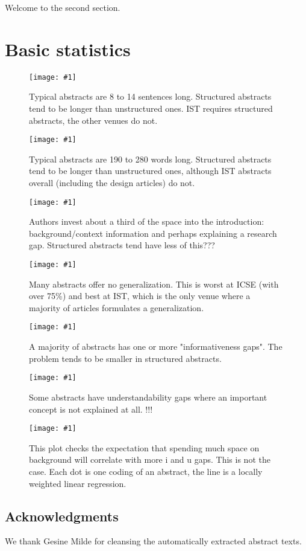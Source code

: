 \documentclass[10pt,journal,compsoc]{IEEEtran}
\newcommand{\Plot}[2]{%
	\begin{figure}[!t]%
		\centering\texttt{[image: \#1]}%
		\vspace{-6mm}\caption{#2}\label{#1}%
	\end{figure}}
\begin{document}
\noindent Welcome to the second section.



\appendix
\section{Basic statistics}

\Plot{boxplots_sentences}{%
  Typical abstracts are 8 to 14 sentences long.
  Structured abstracts tend to be longer than unstructured ones.
  IST requires structured abstracts, the other venues do not.}
\Plot{boxplots_words}{%
  Typical abstracts are 190 to 280 words long. 
  Structured abstracts tend to be longer than unstructured ones, 
  although IST abstracts overall (including the design articles) do not.}
\Plot{boxplots_fraction_introduction}{%
  Authors invest about a third of the space into the introduction:
  background/context information and perhaps explaining a research gap.
  Structured abstracts tend have less of this???}
\Plot{boxplots_fraction_conclusion}{%
  Many abstracts offer no generalization.
  This is worst at ICSE (with over 75\%)
  and best at IST, which is the only venue where a majority of articles formulates a generalization.}
\Plot{boxplots_icount}{%
  A majority of abstracts has one or more "informativeness gaps".
  The problem tends to be smaller in structured abstracts.}
\Plot{boxplots_ucount}{%
  Some abstracts have understandability gaps where an important concept is not explained at all.
  !!!}
\Plot{lowess_gaps_by_fracintro}{%
  This plot checks the expectation that spending much space on background
  will correlate with more i and u gaps.
  This is not the case.
  Each dot is one coding of an abstract, 
  the line is a locally weighted linear regression.}



\subsection{Acknowledgments}
\noindent We thank Gesine Milde for cleansing the automatically extracted abstract texts.




\end{document}
